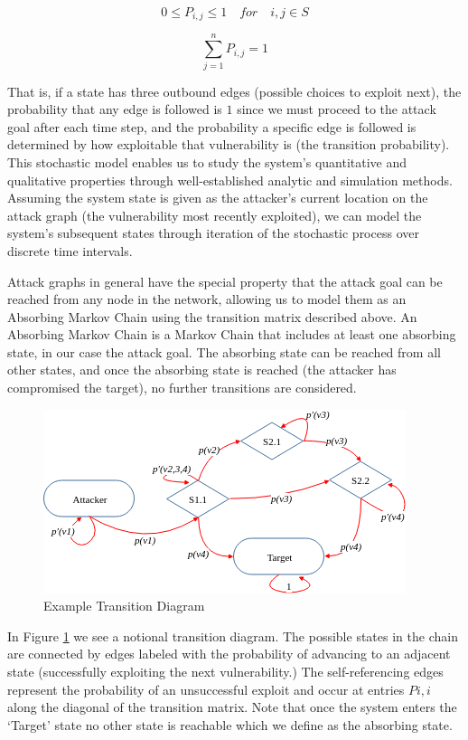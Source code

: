 \[0 \leq P_{i,j} \leq 1\quad for\quad i,j \in S\]

\[\sum_{j=1}^{n} P_{i,j} = 1\]

That is, if a state has three outbound edges (possible choices to exploit next), the probability that any edge is followed is \(1\) since we must proceed to the attack goal after each time step, and the probability a specific edge is followed is determined by how exploitable that vulnerability is (the transition probability). This stochastic model enables us to study the system’s quantitative and qualitative properties through well-established analytic and simulation methods. Assuming the system state is given as the attacker’s current location on the attack graph (the vulnerability most recently exploited), we can model the system’s subsequent states through iteration of the stochastic process over discrete time intervals.  

 

Attack graphs in general have the special property that the attack goal can be reached from any node in the network, allowing us to model them as an Absorbing Markov Chain using the transition matrix described above. An Absorbing Markov Chain is a Markov Chain that includes at least one absorbing state, in our case the attack goal. The absorbing state can be reached from all other states, and once the absorbing state is reached (the attacker has compromised the target), no further transitions are considered.  

\begin{figure}[ht]
\centering
\includegraphics[width=.8\textwidth]{resource/img/ch_background/sdn_analytics/eg_trans_diagram.png}
\caption{Example Transition Diagram}
\label{fig:ag_2}
\end{figure} 

In Figure \ref{fig:ag_2} we see a  notional transition diagram. The possible states in the chain are connected by edges labeled with the probability of advancing to an adjacent state (successfully exploiting the next vulnerability.) The self-referencing edges represent the probability of an unsuccessful exploit and occur at entries \(Pi,i\) along the diagonal of the transition matrix. Note that once the system enters the ‘Target’ state no other state is reachable which we define as the absorbing state.  

